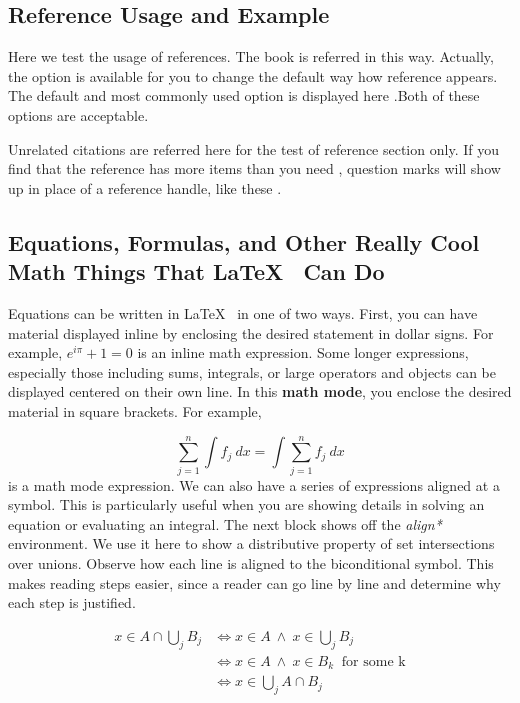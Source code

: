 \subsection{Reference Usage and Example}

Here we test the usage of references. The book\citep{REALCAR} 
is referred in this way. Actually, the option is available for you to change the default way how reference appears. The default and most commonly used option \citep{einstein} is displayed here \citep{Barn-JORVQ}.Both of these options are acceptable. 

Unrelated citations are referred here for the test of reference section only\citep{TAMU}. If you
find that the reference \citep{GIGEM} has more items than you need \citep{WAGFJ}, question marks will show up in place of a reference handle, like these \citep{Over9000}.

\subsection{Equations, Formulas, and Other Really Cool Math Things That \LaTeX ~ Can Do}

Equations can be written in \LaTeX ~ in one of two ways. First, you can have material displayed inline by enclosing the desired statement in dollar signs. For example, $e^{i\pi}+1=0$ is an inline math expression. Some longer expressions, especially those including sums, integrals, or large operators and objects can be displayed centered on their own line. In this \textbf{math mode}, you enclose the desired material in square brackets. For example,

\[ \sum_{j = 1} ^n \int f_j \ dx = \int \sum_{j = 1} ^n f_j \ dx \]
is a math mode expression. We can also have a series of expressions aligned at a symbol. This is particularly useful when you are showing details in solving an equation or evaluating an integral. The next block shows off the \textit{align*} environment. We use it here to show a distributive property of set intersections over unions. Observe how each line is aligned to the biconditional symbol. This makes reading steps easier, since a reader can go line by line and determine why each step is justified.

\begin{align*}
x \in A \cap \bigcup_{j} B_j &\iff x \in A \ \wedge \ x \in \bigcup_{j} B_j \\
&\iff x \in A \ \wedge \ x \in B_k \ \text{ for some k} \\
&\iff x \in \bigcup_{j} A \cap B_j
\end{align*}

